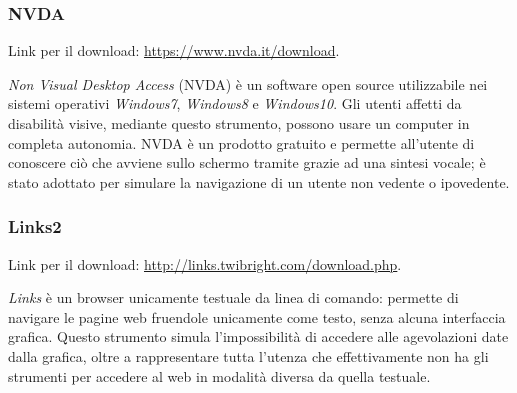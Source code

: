 \subsubsection{NVDA}
\label{test-strumenti-nvda}
Link per il download: \url{https://www.nvda.it/download}.

\textit{Non Visual Desktop Access} (NVDA) è un software open source utilizzabile nei sistemi operativi \textit{Windows7}, \textit{Windows8} e \textit{Windows10}.
Gli utenti affetti da disabilità visive, mediante questo strumento, possono usare un computer in completa autonomia. NVDA è un prodotto gratuito e permette all'utente di conoscere ciò che avviene sullo schermo tramite grazie ad una sintesi vocale; è stato adottato per simulare la navigazione di un utente non vedente o ipovedente.

\subsubsection{Links2}
\label{test-strumenti-links2}
Link per il download: \url{http://links.twibright.com/download.php}.

\textit{Links} è un browser unicamente testuale da linea di comando: permette di navigare le pagine web fruendole unicamente come testo, senza alcuna interfaccia grafica. Questo strumento simula l'impossibilità di accedere alle agevolazioni date dalla grafica, oltre a rappresentare tutta l'utenza che effettivamente non ha gli strumenti per accedere al web in modalità diversa da quella testuale.

